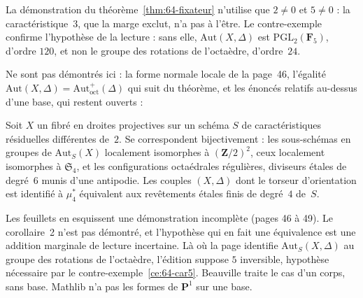 \begin{remarque}
La démonstration du théorème~\ref{thm:64-fixateur} n'utilise que $2 \neq 0$ et $5 \neq 0$ : la caractéristique~$3$, que la marge exclut, n'a pas à l'être. Le contre-exemple confirme l'hypothèse  de la lecture : sans elle, $\mathrm{Aut}(X, \Delta)$ est $\mathrm{PGL}_2(\mathbf F_5)$, d'ordre $120$, et non le groupe des rotations de l'octaèdre, d'ordre~$24$.
\end{remarque}

Ne sont pas démontrés ici : la forme normale locale de la page~46, l'égalité $\mathrm{Aut}(X, \Delta) = \mathrm{Aut}^+_{\mathrm{oct}}(\Delta)$ qui suit du théorème, et les énoncés relatifs au-dessus d'une base, qui restent ouverts :

\begin{encadre}
\begin{theoreme*}\nonverifie
Soit $X$ un fibré en droites projectives sur un schéma $S$ de caractéristiques résiduelles différentes de~$2$. Se correspondent bijectivement : les sous-schémas en groupes de $\mathrm{Aut}_S(X)$ localement isomorphes à $(\mathbf Z/2)^2$, ceux localement isomorphes à $\mathfrak S_4$, et les configurations octaédrales régulières, diviseurs étales de degré~$6$ munis d'une antipodie. Les couples $(X, \Delta)$ dont le torseur d'orientation est identifié à $\mu_4^*$ équivalent aux revêtements étales finis de degré~$4$ de~$S$.
\end{theoreme*}
\end{encadre}
{\small Les feuillets en esquissent une démonstration incomplète (pages 46 à 49). Le corollaire~2 n'est pas démontré, et l'hypothèse qui en fait une équivalence est une addition marginale de lecture incertaine. Là où la page identifie $\mathrm{Aut}_S(X, \Delta)$ au groupe des rotations de l'octaèdre, l'édition suppose $5$ inversible, hypothèse nécessaire par le contre-exemple~\ref{ce:64-car5}. Beauville traite le cas d'un corps, sans base. Mathlib n'a pas les formes de $\mathbf P^1$ sur une base.\par}

